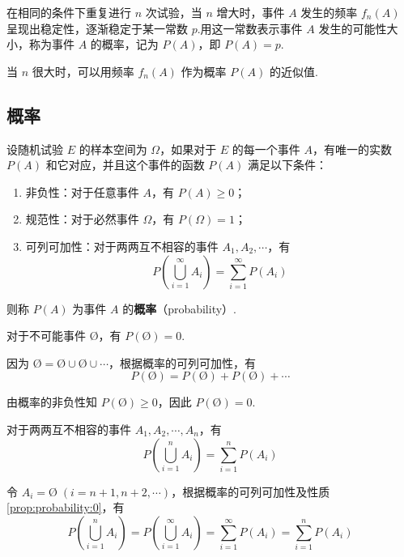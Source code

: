 在相同的条件下重复进行 $n$ 次试验，当 $n$ 增大时，事件 $A$ 发生的频率 $f_n(A)$ 呈现出稳定性，逐渐稳定于某一常数 $p$.用这一常数表示事件 $A$ 发生的可能性大小，称为事件 $A$ 的概率，记为 $P(A)$，即 $P(A)=p$.

当 $n$ 很大时，可以用频率 $f_n(A)$ 作为概率 $P(A)$ 的近似值.

\subsection{概率}

\begin{definition} \label{def:probability}
    设随机试验 $E$ 的样本空间为 $\varOmega$，如果对于 $E$ 的每一个事件 $A$，有唯一的实数 $P(A)$ 和它对应，并且这个事件的函数 $P(A)$ 满足以下条件：
    \begin{enumerate}
        \item 非负性：对于任意事件 $A$，有 $P(A) \geqslant 0$；
        \item 规范性：对于必然事件 $\varOmega$，有 $P(\varOmega)=1$；
        \item 可列可加性：对于两两互不相容的事件 $A_1,A_2,\cdots$，有
        $$
        P(\bigcup_{i=1}^\infty A_i) = \sum_{i=1}^\infty P(A_i)
        $$
    \end{enumerate}
    则称 $P(A)$ 为事件 $A$ 的\textbf{概率}（probability）.
\end{definition}

\setcounter{propertyname}{0}

\begin{property} \label{prop:probability:0}
    对于不可能事件 $\text{\O}$，有 $P(\text{\O})=0$.
\end{property}

\begin{myproof}
    因为 $\text{\O} = \text{\O} \cup \text{\O} \cup \cdots$，根据概率的可列可加性，有
    $$
    P(\text{\O}) = P(\text{\O}) + P(\text{\O}) + \cdots
    $$

    由概率的非负性知 $P(\text{\O}) \geqslant 0$，因此 $P(\text{\O})=0$.
\end{myproof}

\begin{property}[(有限可加性)] \label{prop:probability:sum}
    对于两两互不相容的事件 $A_1,A_2,\cdots,A_n$，有
    \[
    P(\bigcup_{i=1}^n A_i) = \sum_{i=1}^n P(A_i)
    \]
\end{property}

\begin{myproof}
    令 $A_i = \text{\O} \;(i=n+1,n+2,\cdots)$，根据概率的可列可加性及性质\ref*{prop:probability:0}，有
    \[
    P(\bigcup_{i=1}^n A_i) = P(\bigcup_{i=1}^\infty A_i) = \sum_{i=1}^\infty P(A_i) = \sum_{i=1}^n P(A_i)
    \]
\end{myproof}

